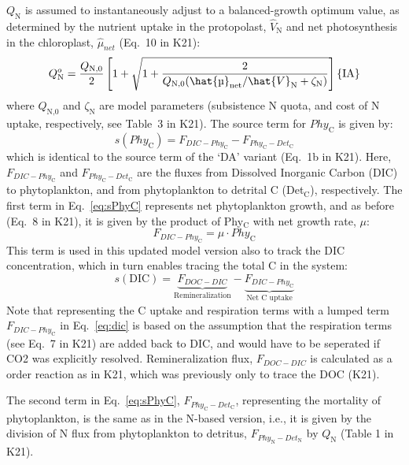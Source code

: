 \documentclass[gmd, manuscript, draft]{copernicus}
\begin{document}
$Q_\text{N}$ is assumed to instantaneously adjust to a balanced-growth optimum value, as determined by the nutrient uptake in the protopolast, $\hat{V}_\text{N}$ and net photosynthesis in the chloroplast, $\hat{\mu}_{net}$ (Eq.~10 in K21):
\begin{equation}\label{eq:Qopt}
 Q_\text{N}^o= \frac{Q_\text{N,0}}{2} \left[1+\sqrt{1+\frac{2}{Q_\text{N,0}{({\hat{\mu}_{\text{net}}}/{\hat{V}_\text{N}}+\zeta_\text{N} )}}} \right] \hfill \{\text{IA}\}
\end{equation}
where $Q_\text{N,0}$ and $\zeta_\text{N}$ are model parameters (subsistence N quota, and cost of N uptake, respectively, see Table~3 in K21). The source term for $Phy_\text{C}$ is given by:
\begin{equation} \label{eq:sPhyC}
s(Phy_{\text{C}}) = F_{DIC-Phy_\text{C}} - F_{Phy_{\text{C}}-Det_{\text{C}}}
\end{equation}
which is identical to the source term of the `DA' variant (Eq.~1b in K21). Here, $F_{DIC-Phy_\text{C}}$ and $F_{Phy_{\text{C}}-Det_{\text{C}}}$ are the fluxes from Dissolved Inorganic Carbon (DIC) to phytoplankton, and from phytoplankton to detrital C (Det$_\text{C}$), respectively. The first term in Eq.~\ref{eq:sPhyC} represents net phytoplankton growth, and as before (Eq.~8 in K21), it is given by the product of Phy$_\text{C}$ with net growth rate, $\mu$: 
\begin{equation} \label{eq:fdicphyc}
 F_{DIC-Phy_\text{C}} = \mu \cdot Phy_\text{C}
\end{equation}
This term is used in this updated model version also to track the DIC concentration, which in turn enables tracing the total C in the system:
\begin{equation} \label{eq:dic}
  s(\text{DIC}) = \underbrace{F_{DOC-DIC}}_\textrm{Remineralization} - \underbrace{F_{DIC-Phy_{\text{C}}}}_\textrm{Net C uptake}
\end{equation}
Note that representing the C uptake and respiration terms with a lumped term $F_{DIC-Phy_{\text{C}}}$ in Eq.~\ref{eq:dic} is based on the assumption that the respiration terms (see Eq.~7 in K21) are added back to DIC, and would have to be seperated if CO2 was explicitly resolved. Remineralization flux, $F_{DOC-DIC}$ is calculated as a order reaction as in K21, which was previously only to trace the DOC (K21).

The second term in Eq.~\ref{eq:sPhyC}, $F_{Phy_\text{C}-Det_\text{C}}$, representing the mortality of phytoplankton, is the same as in the N-based version, i.e., it is given by the division of N flux from phytoplankton to detritus, $F_{Phy_\text{N}-Det_\text{N}}$ by $Q_\text{N}$ (Table 1 in K21).
\end{document}
